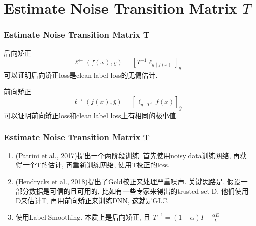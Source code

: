 \documentclass{beamer}
\begin{document}
\section{Estimate Noise Transition Matrix $T$}

\begin{frame}
    \frametitle{Estimate Noise Transition Matrix $\bm T$}
    
    \begin{definition}
        后向矫正
        \begin{equation}
            \ell^{\leftarrow}(f(x), \bar{y})=\left[T^{-1} \ell_{y \mid f(x)}\right]_{\bar{y}}
        \end{equation}
        可以证明后向矫正loss是clean label loss的无偏估计.
    \end{definition}
    

    \begin{definition}
        前向矫正
        \begin{equation}
            \ell^{\rightarrow}(f(x), \bar{y})=\left[\ell_{y \mid T^{\top}} f(x)\right]_{\bar{y}}
        \end{equation}
        可以证明前向矫正loss和clean label loss上有相同的极小值.
    \end{definition}
    

    
    
\end{frame}

\begin{frame}
    \frametitle{Estimate Noise Transition Matrix $\bm T$}

    \begin{enumerate}
        \item (Patrini et al., 2017)提出一个两阶段训练. 首先使用noisy data训练网络, 再获得一个T的估计, 再重新训练网络, 使用T校正的loss.
        \item (Hendrycks et al., 2018)提出了Gold校正来处理严重噪声. 关键思路是, 假设一部分数据是可信的且可用的, 比如有一些专家来得出的trusted set D. 他们使用D来估计T, 再用前向矫正来训练DNN, 这就是GLC.
        \item 使用Label Smoothing. 本质上是后向矫正, 且
        $T^{-1}=(1-\alpha) I+\frac{\alpha E}{L}$
    \end{enumerate}

\end{frame}
\end{document}
